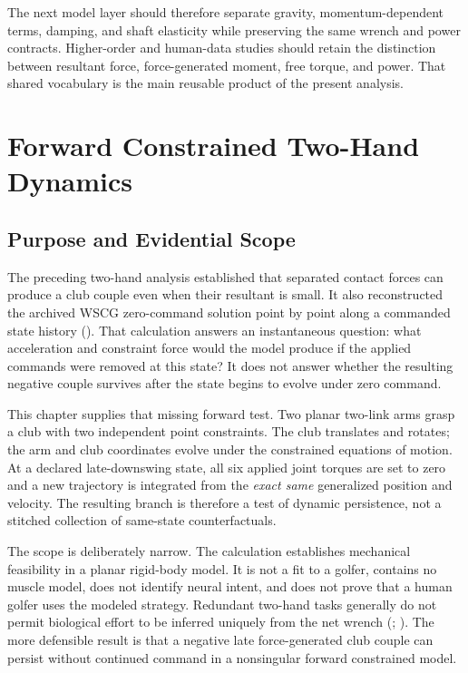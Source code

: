 \documentclass[
  letterpaper,
]{report}
\begin{document}
The next model layer should therefore separate gravity,
momentum-dependent terms, damping, and shaft elasticity while preserving
the same wrench and power contracts. Higher-order and human-data studies
should retain the distinction between resultant force, force-generated
moment, free torque, and power. That shared vocabulary is the main
reusable product of the present analysis.

\chapter{Forward Constrained Two-Hand
Dynamics}\label{sec-forward-two-hand}

\section{Purpose and Evidential Scope}\label{sec-forward-two-hand-scope}

The preceding two-hand analysis established that separated contact
forces can produce a club couple even when their resultant is small. It
also reconstructed the archived WSCG zero-command solution point by
point along a commanded state history
(). That calculation answers an
instantaneous question: what acceleration and constraint force would the
model produce if the applied commands were removed at this state? It
does not answer whether the resulting negative couple survives after the
state begins to evolve under zero command.

This chapter supplies that missing forward test. Two planar two-link
arms grasp a club with two independent point constraints. The club
translates and rotates; the arm and club coordinates evolve under the
constrained equations of motion. At a declared late-downswing state, all
six applied joint torques are set to zero and a new trajectory is
integrated from the \emph{exact same} generalized position and velocity.
The resulting branch is therefore a test of dynamic persistence, not a
stitched collection of same-state counterfactuals.

The scope is deliberately narrow. The calculation establishes mechanical
feasibility in a planar rigid-body model. It is not a fit to a golfer,
contains no muscle model, does not identify neural intent, and does not
prove that a human golfer uses the modeled strategy. Redundant two-hand
tasks generally do not permit biological effort to be inferred uniquely
from the net wrench (;
).
The more defensible result is that a negative late force-generated club
couple can persist without continued command in a nonsingular forward
constrained model.
\end{document}
